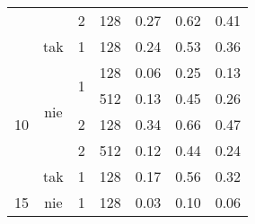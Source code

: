 \begin{description}
\begin{table}[ht]
{\begin{tabular}{cccclll}
        \multicolumn{1}{|c|}{}                    & \multicolumn{1}{c|}{}                     & \multicolumn{1}{c|}{2}                  & \multicolumn{1}{c|}{128}                        & \multicolumn{1}{l|}{0.27}     & \multicolumn{1}{l|}{0.62}     & \multicolumn{1}{l|}{0.41}                    \\ \cline{2-7} 
        \multicolumn{1}{|c|}{}                    & \multicolumn{1}{c|}{tak}                  & \multicolumn{1}{c|}{1}                  & \multicolumn{1}{c|}{128}                        & \multicolumn{1}{l|}{0.24}     & \multicolumn{1}{l|}{0.53}     & \multicolumn{1}{l|}{0.36}                    \\ \hline
        \multicolumn{1}{|c|}{\multirow{5}{*}{10}} & \multicolumn{1}{c|}{\multirow{4}{*}{nie}} & \multicolumn{1}{c|}{\multirow{2}{*}{1}} & \multicolumn{1}{c|}{128}                        & \multicolumn{1}{l|}{0.06}     & \multicolumn{1}{l|}{0.25}     & \multicolumn{1}{l|}{0.13}                    \\ \cline{4-7} 
        \multicolumn{1}{|c|}{}                    & \multicolumn{1}{c|}{}                     & \multicolumn{1}{c|}{}                   & \multicolumn{1}{c|}{512}                        & \multicolumn{1}{l|}{0.13}     & \multicolumn{1}{l|}{0.45}     & \multicolumn{1}{l|}{0.26}                    \\ \cline{3-7} 
        \multicolumn{1}{|c|}{}                    & \multicolumn{1}{c|}{}                     & \multicolumn{1}{c|}{2}                  & \multicolumn{1}{c|}{128}                        & \multicolumn{1}{l|}{0.34}     & \multicolumn{1}{l|}{0.66}    & \multicolumn{1}{l|}{0.47}                    \\ \cline{3-7} 
        \multicolumn{1}{|c|}{}                    & \multicolumn{1}{c|}{}                     & \multicolumn{1}{c|}{2}                  & \multicolumn{1}{c|}{512}                        & \multicolumn{1}{l|}{0.12}     & \multicolumn{1}{l|}{0.44}     & \multicolumn{1}{l|}{0.24}                    \\ \cline{2-7} 
        \multicolumn{1}{|c|}{}                    & \multicolumn{1}{c|}{tak}                  & \multicolumn{1}{c|}{1}                  & \multicolumn{1}{c|}{128}                        & \multicolumn{1}{l|}{0.17}     & \multicolumn{1}{l|}{0.56}     & \multicolumn{1}{l|}{0.32}                    \\ \hline
        \multicolumn{1}{|c|}{\multirow{2}{*}{15}} & \multicolumn{1}{c|}{\multirow{2}{*}{nie}} & \multicolumn{1}{c|}{\multirow{2}{*}{1}} & \multicolumn{1}{c|}{128}                        & \multicolumn{1}{l|}{0.03}     & \multicolumn{1}{l|}{0.10}     & \multicolumn{1}{l|}{0.06}                    \\ \cline{4-7} 

\end{tabular}}
\end{table}
\end{description}
